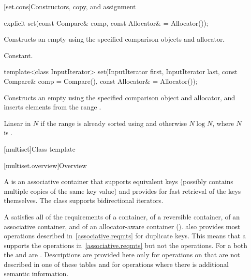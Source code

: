 [set.cons]{Constructors, copy, and assignment}

%
\begin{itemdecl}
explicit set(const Compare& comp, const Allocator& = Allocator());
\end{itemdecl}

\begin{itemdescr}
\pnum
\effects
Constructs an empty  using the specified comparison objects and allocator.

\pnum
\complexity
Constant.
\end{itemdescr}

%
\begin{itemdecl}
template<class InputIterator>
  set(InputIterator first, InputIterator last,
      const Compare& comp = Compare(), const Allocator& = Allocator());
\end{itemdecl}

\begin{itemdescr}
\pnum
\effects
Constructs an empty
using the specified comparison object and allocator,
and inserts elements from the range
.

\pnum
\complexity
Linear in $N$ if the range
is already sorted using 
and otherwise $N \log N$,
where $N$ is
.
\end{itemdescr}

[multiset]{Class template }

[multiset.overview]{Overview}

\pnum
{}%
A
is an associative container that supports equivalent keys (possibly contains multiple copies of
the same key value) and provides for fast retrieval of the keys themselves.
The
 class
supports bidirectional iterators.

\pnum
A  satisfies all of the requirements of a container, of a
reversible container, of an associative
container, and of an allocator-aware container
().
also provides most operations described in~\ref{associative.reqmts}
for duplicate keys.
This means that a
supports the
operations in~\ref{associative.reqmts}
but not the
operations.
For a
both the
and
are
.
Descriptions are provided here only for operations on
that are not described in one of these tables
and for operations where there is additional semantic information.

